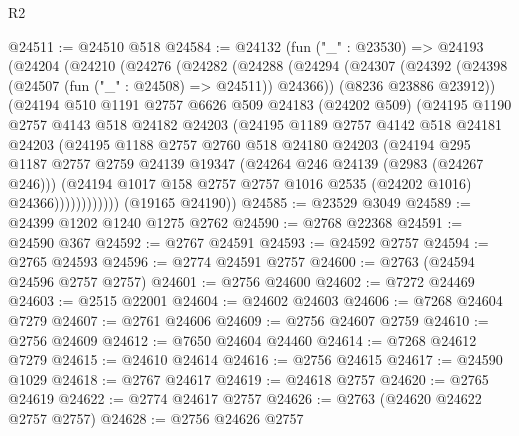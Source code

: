\begin{lexlean}{R2}
\begin{coremodule}
@24511 := @24510 @518
@24584 := @24132
    (fun ("_" : @23530) =>
    @24193
      (@24204
        (@24210
          (@24276
            (@24282
              (@24288
                (@24294
                  (@24307
                    (@24392 (@24398 (@24507 (fun ("_" : @24508) => @24511)) @24366))
                    (@8236 @23886 @23912))
                  (@24194
                    @510
                    @1191
                    @2757
                    @6626
                    @509
                    @24183
                    (@24202 @509)
                    (@24195
                      @1190
                      @2757
                      @4143
                      @518
                      @24182
                      @24203
                      (@24195
                        @1189
                        @2757
                        @4142
                        @518
                        @24181
                        @24203
                        (@24195
                          @1188
                          @2757
                          @2760
                          @518
                          @24180
                          @24203
                          (@24194
                            @295
                            @1187
                            @2757
                            @2759
                            @24139
                            @19347
                            (@24264 @246 @24139 (@2983 (@24267 @246)))
                            (@24194
                              @1017
                              @158
                              @2757
                              @2757
                              @1016
                              @2535
                              (@24202 @1016)
                              @24366))))))))))))
      (@19165 @24190))
@24585 := @23529 @3049
@24589 := @24399 @1202 @1240 @1275 @2762
@24590 := @2768 @22368
@24591 := @24590 @367
@24592 := @2767 @24591
@24593 := @24592 @2757
@24594 := @2765 @24593
@24596 := @2774 @24591 @2757
@24600 := @2763 (@24594 @24596 @2757 @2757)
@24601 := @2756 @24600
@24602 := @7272 @24469
@24603 := @2515 @22001
@24604 := @24602 @24603
@24606 := @7268 @24604 @7279
@24607 := @2761 @24606
@24609 := @2756 @24607 @2759
@24610 := @2756 @24609
@24612 := @7650 @24604 @24460
@24614 := @7268 @24612 @7279
@24615 := @24610 @24614
@24616 := @2756 @24615
@24617 := @24590 @1029
@24618 := @2767 @24617
@24619 := @24618 @2757
@24620 := @2765 @24619
@24622 := @2774 @24617 @2757
@24626 := @2763 (@24620 @24622 @2757 @2757)
@24628 := @2756 @24626 @2757

\end{coremodule}
\end{lexlean}
